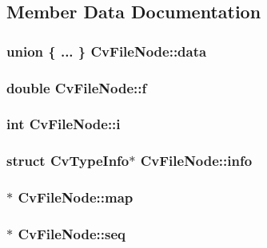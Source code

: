 \subsection{Member Data Documentation}
\hypertarget{structCvFileNode_a533ef312fade7e33eb1d7abedfddc696}{
\subsubsection[{data}]{\setlength{\rightskip}{0pt plus 5cm}union \{ ... \}   Cv\-File\-Node\-::data}}\label{structCvFileNode_a533ef312fade7e33eb1d7abedfddc696}
\hypertarget{structCvFileNode_a4c8bb4f7092b56aad9c3a7d7f2dfff2d}{
\subsubsection[{f}]{\setlength{\rightskip}{0pt plus 5cm}double Cv\-File\-Node\-::f}}\label{structCvFileNode_a4c8bb4f7092b56aad9c3a7d7f2dfff2d}
\hypertarget{structCvFileNode_afadd155e3f165fc945e0fe2a3ce05831}{
\subsubsection[{i}]{\setlength{\rightskip}{0pt plus 5cm}int Cv\-File\-Node\-::i}}\label{structCvFileNode_afadd155e3f165fc945e0fe2a3ce05831}
\hypertarget{structCvFileNode_a70ed8cf9a3e5b24aa8ec462537513b89}{
\subsubsection[{info}]{\setlength{\rightskip}{0pt plus 5cm}struct {\bf Cv\-Type\-Info}$\ast$ Cv\-File\-Node\-::info}}\label{structCvFileNode_a70ed8cf9a3e5b24aa8ec462537513b89}
\hypertarget{structCvFileNode_a0c054f98473908434e02f37603d746c7}{
\subsubsection[{map}]{$\ast$ Cv\-File\-Node\-::map}}\label{structCvFileNode_a0c054f98473908434e02f37603d746c7}
\hypertarget{structCvFileNode_ab2d72866b14ccf2414404f0c5ba443bb}{
\subsubsection[{seq}]{$\ast$ Cv\-File\-Node\-::seq}}\label{structCvFileNode_ab2d72866b14ccf2414404f0c5ba443bb}
